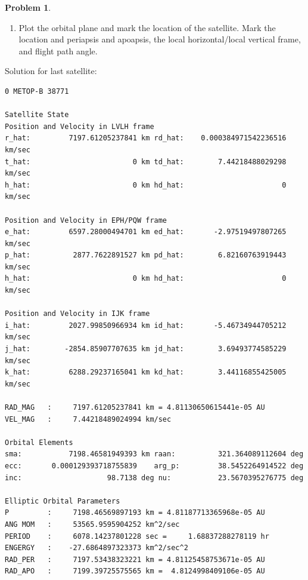 \documentclass[10pt]{article}
\theoremstyle{definition}
\newtheorem{prob}{Problem}[section]
\newenvironment{subprob}%
{\renewcommand{\theenumi}{\alph{enumi}}\renewcommand{\labelenumi}{(\theenumi)}\begin{enumerate}}%
{\end{enumerate}}%
\begin{document}
\begin{prob}
\begin{subprob}
    The orbital properties of the last satellite, bottom row, is given below.
    You should provide your hand calculations demonstrating the computation of the orbital properties for this case. 
    This test case is used to verify your software is working correctly.
    For the other cases, you can simply provide the output of your program.
\item Plot the orbital plane and mark the location of the satellite.
    Mark the location and periapsis and apoapsis, the local horizontal/local vertical frame, and flight path angle.
    \end{subprob}

Solution for last satellite:

    \begin{verbatim}
0 METOP-B 38771  

Satellite State  
Position and Velocity in LVLH frame                                  
r_hat:         7197.61205237841 km rd_hat:    0.000384971542236516 km/sec
t_hat:                        0 km td_hat:        7.44218488029298 km/sec
h_hat:                        0 km hd_hat:                       0 km/sec

Position and Velocity in EPH/PQW frame                               
e_hat:         6597.28000494701 km ed_hat:       -2.97519497807265 km/sec
p_hat:          2877.7622891527 km pd_hat:        6.82160763919443 km/sec
h_hat:                        0 km hd_hat:                       0 km/sec

Position and Velocity in IJK frame                                   
i_hat:         2027.99850966934 km id_hat:       -5.46734944705212 km/sec
j_hat:        -2854.85907707635 km jd_hat:        3.69493774585229 km/sec
k_hat:         6288.29237165041 km kd_hat:        3.44116855425005 km/sec

RAD_MAG   :     7197.61205237841 km = 4.81130650615441e-05 AU        
VEL_MAG   :     7.44218489024994 km/sec                              

Orbital Elements                  
sma:           7198.46581949393 km raan:          321.364089112604 deg
ecc:       0.000129393718755839    arg_p:         38.5452264914522 deg
inc:                    98.7138 deg nu:           23.5670395276775 deg

Elliptic Orbital Parameters       
P         :     7198.46569897193 km = 4.81187713365968e-05 AU        
ANG MOM   :     53565.9595904252 km^2/sec                            
PERIOD    :     6078.14237801228 sec =     1.68837288278119 hr       
ENGERGY   :    -27.6864897323373 km^2/sec^2                          
RAD_PER   :     7197.53438323221 km = 4.81125458753671e-05 AU        
RAD_APO   :     7199.39725575565 km =  4.8124998409106e-05 AU        


\end{verbatim}
\end{prob}
\end{document}
